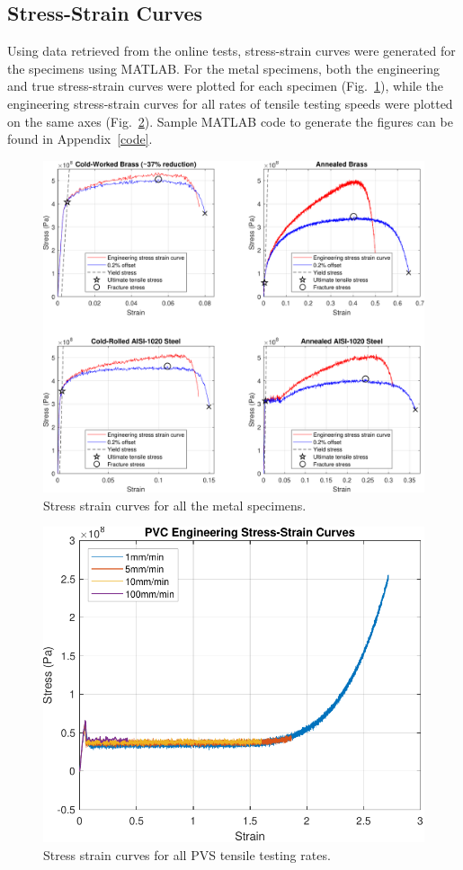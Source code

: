 \documentclass[11pt]{article}
\begin{document}
        \subsection{Stress-Strain Curves}
            Using data retrieved from the online tests, stress-strain curves were generated for the specimens using MATLAB.\@
            For the metal specimens, both the engineering and true stress-strain curves were plotted for each specimen (Fig.~\ref{fig:metals_ss}), while the engineering stress-strain curves for all rates of tensile testing speeds were plotted on the same axes (Fig.~\ref{fig:pvc_ss}). Sample MATLAB code to generate the figures can be found in Appendix~\ref{code}.
            \bigskip
            \begin{figure}[H]
                \centering
                \includegraphics[width=0.9\linewidth]{metals_ss.pdf}
                \caption{Stress strain curves for all the metal specimens.}\label{fig:metals_ss}
            \end{figure}
            \begin{figure}[H]
                \centering
                \includegraphics[width=0.5\linewidth]{pvc_ss.pdf}
                \caption{Stress strain curves for all PVS tensile testing rates.}\label{fig:pvc_ss}
            \end{figure}
\end{document}
